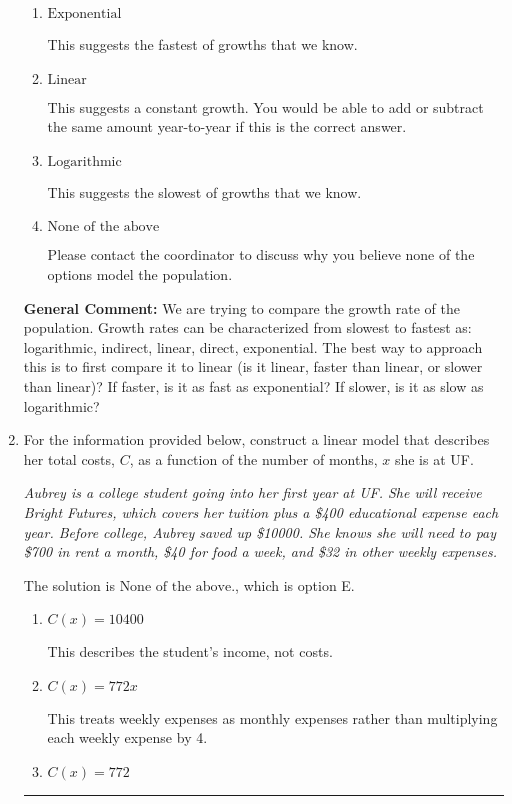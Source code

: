 \documentclass{extbook}[14pt]
\newcommand{\litem}[1]{\item #1

\rule{\textwidth}{0.4pt}}
\begin{document}
\begin{enumerate}
{\begin{enumerate}[label=\Alph*.]
This suggests a growth faster than constant but slower than exponential.
\item \( \text{Exponential} \)

This suggests the fastest of growths that we know.
\item \( \text{Linear} \)

This suggests a constant growth. You would be able to add or subtract the same amount year-to-year if this is the correct answer.
\item \( \text{Logarithmic} \)

This suggests the slowest of growths that we know.
\item \( \text{None of the above} \)

Please contact the coordinator to discuss why you believe none of the options model the population.
\end{enumerate}

\textbf{General Comment:} We are trying to compare the growth rate of the population. Growth rates can be characterized from slowest to fastest as: logarithmic, indirect, linear, direct, exponential. The best way to approach this is to first compare it to linear (is it linear, faster than linear, or slower than linear)? If faster, is it as fast as exponential? If slower, is it as slow as logarithmic?
}
\litem{
For the information provided below, construct a linear model that describes her total costs, $C$, as a function of the number of months, $x$ she is at UF. 

\begin{center}
    \textit{ Aubrey is a college student going into her first year at UF. She will receive Bright Futures, which covers her tuition plus a \$400 educational expense each year. Before college, Aubrey saved up \$10000. She knows she will need to pay \$700 in rent a month, \$40 for food a week, and \$32 in other weekly expenses. }
\end{center}
The solution is \( \text{None of the above.} \), which is option E.\begin{enumerate}[label=\Alph*.]
\item \( C(x) = 10400 \)

This describes the student's income, not costs.
\item \( C(x) = 772 x \)

This treats weekly expenses as monthly expenses rather than multiplying each weekly expense by 4.
\item \( C(x) = 772 \)


\end{enumerate}}
\end{enumerate}
\end{document}
